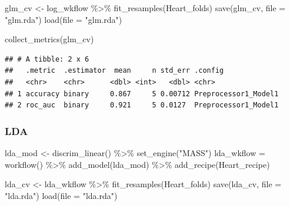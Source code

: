 \documentclass[
]{article}
\newenvironment{Shaded}{\begin{snugshade}}{\end{snugshade}}
\newcommand{\AttributeTok}[1]{\textcolor[rgb]{0.77,0.63,0.00}{#1}}
\newcommand{\FunctionTok}[1]{\textcolor[rgb]{0.00,0.00,0.00}{#1}}
\newcommand{\NormalTok}[1]{#1}
\newcommand{\OtherTok}[1]{\textcolor[rgb]{0.56,0.35,0.01}{#1}}
\newcommand{\SpecialCharTok}[1]{\textcolor[rgb]{0.00,0.00,0.00}{#1}}
\newcommand{\StringTok}[1]{\textcolor[rgb]{0.31,0.60,0.02}{#1}}
\begin{document}
\begin{Shaded}
\begin{Highlighting}[]
\NormalTok{glm\_cv }\OtherTok{\textless{}{-}}\NormalTok{ log\_wkflow }\SpecialCharTok{\%\textgreater{}\%}
  \FunctionTok{fit\_resamples}\NormalTok{(Heart\_folds)}
\FunctionTok{save}\NormalTok{(glm\_cv, }\AttributeTok{file =} \StringTok{"glm.rda"}\NormalTok{)}
\FunctionTok{load}\NormalTok{(}\AttributeTok{file =} \StringTok{"glm.rda"}\NormalTok{)}
\end{Highlighting}
\end{Shaded}

\begin{Shaded}
\begin{Highlighting}[]
\FunctionTok{collect\_metrics}\NormalTok{(glm\_cv)}
\end{Highlighting}
\end{Shaded}

\begin{verbatim}
## # A tibble: 2 x 6
##   .metric  .estimator  mean     n std_err .config             
##   <chr>    <chr>      <dbl> <int>   <dbl> <chr>               
## 1 accuracy binary     0.867     5 0.00712 Preprocessor1_Model1
## 2 roc_auc  binary     0.921     5 0.0127  Preprocessor1_Model1
\end{verbatim}

\hypertarget{lda}{%
\subsubsection{LDA}\label{lda}}

\begin{Shaded}
\begin{Highlighting}[]
\NormalTok{lda\_mod }\OtherTok{\textless{}{-}} \FunctionTok{discrim\_linear}\NormalTok{() }\SpecialCharTok{\%\textgreater{}\%}
  \FunctionTok{set\_engine}\NormalTok{(}\StringTok{"MASS"}\NormalTok{)}
\NormalTok{lda\_wkflow }\OtherTok{=} \FunctionTok{workflow}\NormalTok{() }\SpecialCharTok{\%\textgreater{}\%}
  \FunctionTok{add\_model}\NormalTok{(lda\_mod) }\SpecialCharTok{\%\textgreater{}\%}
  \FunctionTok{add\_recipe}\NormalTok{(Heart\_recipe)}
\end{Highlighting}
\end{Shaded}

\begin{Shaded}
\begin{Highlighting}[]
\NormalTok{lda\_cv }\OtherTok{\textless{}{-}}\NormalTok{ lda\_wkflow }\SpecialCharTok{\%\textgreater{}\%}
  \FunctionTok{fit\_resamples}\NormalTok{(Heart\_folds)}
\FunctionTok{save}\NormalTok{(lda\_cv, }\AttributeTok{file =} \StringTok{"lda.rda"}\NormalTok{)}
\FunctionTok{load}\NormalTok{(}\AttributeTok{file =} \StringTok{"lda.rda"}\NormalTok{)}
\end{Highlighting}
\end{Shaded}
\end{document}
